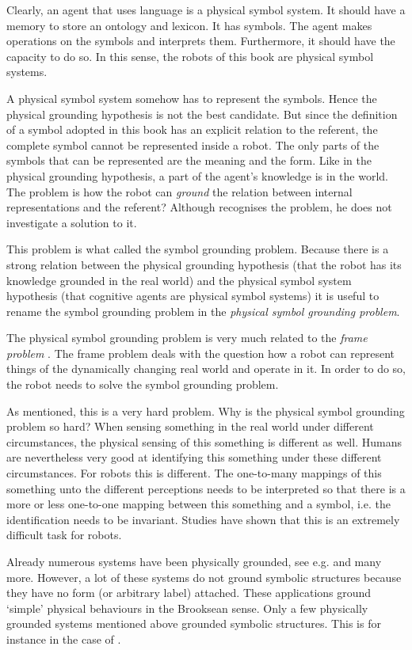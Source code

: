Clearly, an agent that uses language is a physical symbol system. It should have a memory to store an ontology and lexicon. It has symbols. The agent makes operations on the symbols and interprets them. Furthermore, it should have the capacity to do so. In this sense, the robots of this book are physical symbol systems.

A physical symbol system somehow has to represent the symbols. Hence the physical grounding hypothesis is not the best candidate. But since the definition of a symbol adopted in this book has an explicit relation to the referent, the complete symbol cannot be represented inside a robot. The only parts of the symbols that can be represented are the meaning and the form. Like in the physical grounding hypothesis, a part of the agent's knowledge is in the world. The problem is how the robot can {\em ground} the relation between internal representations and the referent? Although \citet{newell:1990} recognises the problem, he does not investigate a solution to it.

This problem is what \citep{harnad:1990} called the symbol grounding problem. Because there is a strong relation between the physical grounding hypothesis (that the robot has its knowledge grounded in the real world) and the physical symbol system hypothesis (that cognitive agents are physical symbol systems) it is useful to rename the symbol grounding problem in the {\em physical symbol grounding problem}.

The physical symbol grounding problem is very much related to the {\em frame problem} \citep{pylyshyn:1987}. The frame problem deals with the question how a robot can represent things of the dynamically changing real world and operate in it. In order to do so, the robot needs to solve the symbol grounding problem. 


As mentioned, this is a very hard problem. Why is the physical symbol grounding problem so hard? When sensing something in the real world under different circumstances, the physical sensing of this something is different as well. Humans are nevertheless very good at identifying this something under these different circumstances. For robots this is different. The one-to-many mappings of this something unto the different perceptions needs to be interpreted so that there is a more or less one-to-one mapping between this something and a symbol, i.e. the identification needs to be invariant. Studies have shown that this is an extremely difficult task for robots.

Already numerous systems have been physically grounded, see e.g. \citep{brooks:1990,steels:1994,barnesetal:1997,KroBunVlaMot99,taninolfi:1998,berthouzekuniyoshi:1998,pfeiferscheier:1999,billard:1997a,rosenstein:1998a,yancostein} and many more. However, a lot of these systems do not ground symbolic structures because they have no form (or arbitrary label) attached. These applications ground `simple' physical behaviours in the Brooksean sense. Only a few physically grounded systems mentioned above grounded symbolic structures. This is for instance in the case of \citep{yancostein,billard:1997a,rosenstein:1998a}. 


